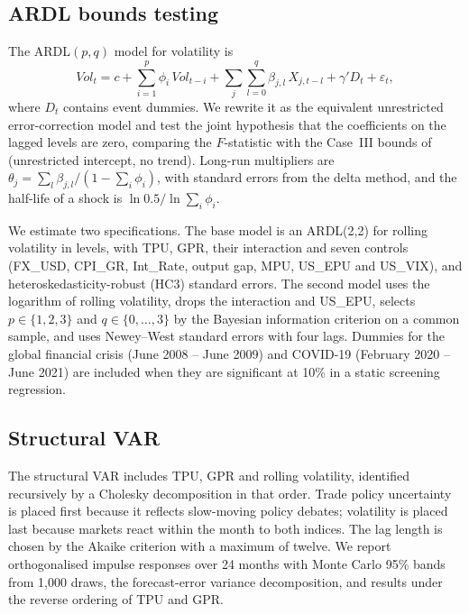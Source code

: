 \documentclass[10pt,twocolumn,a4paper]{article}
\begin{document}
\subsection{ARDL bounds testing}

The ARDL$(p,q)$ model for volatility is
\begin{equation}
Vol_t = c + \sum_{i=1}^{p}\phi_i\, Vol_{t-i} + \sum_{j}\sum_{l=0}^{q}\beta_{j,l}\,X_{j,t-l} + \gamma' D_t + \varepsilon_t ,
\end{equation}
where $D_t$ contains event dummies. We rewrite it as the equivalent unrestricted error-correction model and test the joint hypothesis that the coefficients on the lagged levels are zero, comparing the $F$-statistic with the Case~III bounds of \citet{pesaran2001} (unrestricted intercept, no trend). Long-run multipliers are $\theta_j=\sum_l\beta_{j,l}/(1-\sum_i\phi_i)$, with standard errors from the delta method, and the half-life of a shock is $\ln 0.5/\ln\sum_i\phi_i$.

We estimate two specifications. The base model is an ARDL(2,2) for rolling volatility in levels, with TPU, GPR, their interaction and seven controls (FX\_USD, CPI\_GR, Int\_Rate, output gap, MPU, US\_EPU and US\_VIX), and heteroskedasticity-robust (HC3) standard errors. The second model uses the logarithm of rolling volatility, drops the interaction and US\_EPU, selects $p\in\{1,2,3\}$ and $q\in\{0,\dots,3\}$ by the Bayesian information criterion on a common sample, and uses Newey--West standard errors with four lags. Dummies for the global financial crisis (June 2008 -- June 2009) and COVID-19 (February 2020 -- June 2021) are included when they are significant at 10\% in a static screening regression.

\subsection{Structural VAR}

The structural VAR includes TPU, GPR and rolling volatility, identified recursively by a Cholesky decomposition in that order. Trade policy uncertainty is placed first because it reflects slow-moving policy debates; volatility is placed last because markets react within the month to both indices. The lag length is chosen by the Akaike criterion with a maximum of twelve. We report orthogonalised impulse responses over 24 months with Monte Carlo 95\% bands from 1,000 draws, the forecast-error variance decomposition, and results under the reverse ordering of TPU and GPR.
\end{document}
